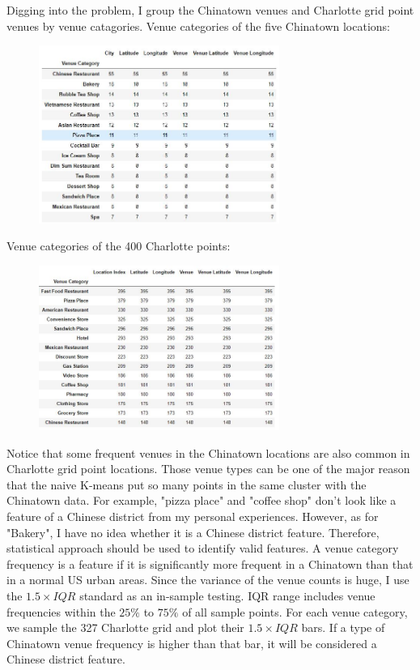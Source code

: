 \documentclass{article}
\begin{document}
Digging into the problem, I group the Chinatown venues and Charlotte grid point venues by venue catagories.
Venue categories of the five Chinatown locations:
\begin{figure}[h!]
\includegraphics[width=0.7\textwidth]{csp1.jpg}
\centering
\end{figure}
Venue categories of the 400 Charlotte points:
\begin{figure}[h!]
\includegraphics[width=0.7\textwidth]{csp2.jpg}
\centering
\end{figure}
Notice that some frequent venues in the Chinatown locations are also common in Charlotte grid point locations.
Those venue types can be one of the major reason that the naive K-means put so many points in the same cluster with the Chinatown data.
For example, "pizza place" and "coffee shop" don't look like a feature of a Chinese district from my personal experiences.
However, as for "Bakery", I have no idea whether it is a Chinese district feature.
Therefore, statistical approach should be used to identify valid features.
A venue category frequency is a feature if it is significantly more frequent in a Chinatown than that in a normal US urban areas.
Since the variance of the venue counts is huge, I use the $1.5 \times IQR$ standard as an in-sample testing.
IQR range includes venue frequencies within the $25\%$ to $75\%$ of all sample points.
For each venue category, we sample the 327 Charlotte grid and plot their $1.5 \times IQR$ bars. 
If a type of Chinatown venue frequency is higher than that bar, it will be considered a Chinese district feature.
\end{document}
